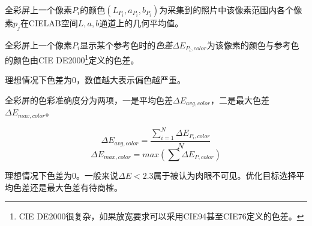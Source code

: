 \begin{defn}
    全彩屏上一个像素$P_i$的颜色$(L_{P_i},a_{P_i},b_{P_i})$为采集到的照片中该像素范围内各个像素$p_j$在CIELAB空间$L,a,b$通道上的几何平均值。
\end{defn}

\begin{defn}
    全彩屏上一个像素$P_i$显示某个参考色时的\emph{色差}$\Delta E_{P_i,color}$为该像素的颜色与参考色的颜色由CIE DE2000\footnote{CIE DE2000很复杂，如果放宽要求可以采用CIE94甚至CIE76定义的色差。}定义的色差。

\end{defn}

理想情况下色差为$0$，数值越大表示偏色越严重。

\begin{defn}
    全彩屏的色彩准确度分为两项，一是平均色差$\Delta E_{avg,color}$，二是最大色差$\Delta E_{max,color}$。

    \begin{equation}
        \Delta E_{avg,color} = \frac{\sum_{i=1}^N{\Delta E_{P_i,color}}}{N}
    \end{equation}
    \begin{equation}
        \Delta E_{max,color} = max\left(\sum{\Delta E_{P,color}}\right)
    \end{equation}
\end{defn}

理想情况下色差为$0$。一般来说$\Delta E<2.3$属于被认为肉眼不可见。优化目标选择平均色差还是最大色差有待商榷。


